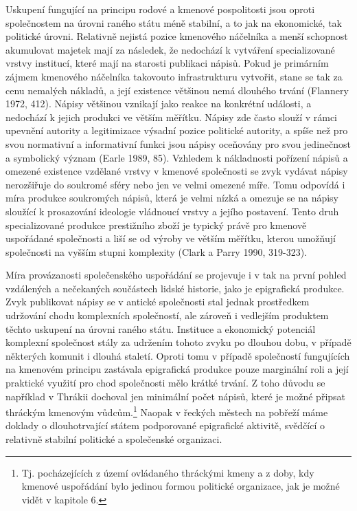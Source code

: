 Uskupení fungující na principu rodové a kmenové pospolitosti jsou oproti společnostem na úrovni raného státu méně stabilní, a to jak na ekonomické, tak politické úrovni. Relativně nejistá pozice kmenového náčelníka a menší schopnost akumulovat majetek mají za následek, že nedochází k vytváření specializované vrstvy institucí, které mají na starosti publikaci nápisů. Pokud je primárním zájmem kmenového náčelníka takovouto infrastrukturu vytvořit, stane se tak za cenu nemalých nákladů, a její existence většinou nemá dlouhého trvání (Flannery 1972, 412). Nápisy většinou vznikají jako reakce na konkrétní události, a nedochází k jejich produkci ve větším měřítku. Nápisy zde často slouží v rámci upevnění autority a legitimizace výsadní pozice politické autority, a spíše než pro svou normativní a informativní funkci jsou nápisy oceňovány pro svou jedinečnost a symbolický význam (Earle 1989, 85). Vzhledem k nákladnosti pořízení nápisů a omezené existence vzdělané vrstvy v kmenové společnosti se zvyk vydávat nápisy nerozšiřuje do soukromé sféry nebo jen ve velmi omezené míře. Tomu odpovídá i míra produkce soukromých nápisů, která je velmi nízká a omezuje se na nápisy sloužící k prosazování ideologie vládnoucí vrstvy a jejího postavení. Tento druh specializované produkce prestižního zboží je typický právě pro kmenově uspořádané společnosti a liší se od výroby ve větším měřítku, kterou umožňují společnosti na vyšším stupni komplexity (Clark a Parry 1990, 319-323).

Míra provázanosti společenského uspořádání se projevuje i v tak na první pohled vzdálených a nečekaných součástech lidské historie, jako je epigrafická produkce. Zvyk publikovat nápisy se v antické společnosti stal jednak prostředkem udržování chodu komplexních společností, ale zároveň i vedlejším produktem těchto uskupení na úrovni raného státu. Instituce a ekonomický potenciál komplexní společnost stály za udržením tohoto zvyku po dlouhou dobu, v případě některých komunit i dlouhá staletí. Oproti tomu v případě společností fungujících na kmenovém principu zastávala epigrafická produkce pouze marginální roli a její praktické využití pro chod společnosti mělo krátké trvání. Z toho důvodu se například v Thrákii dochoval jen minimální počet nápisů, které je možné připsat thráckým kmenovým vůdcům.\footnote{Tj. pocházejících z území ovládaného thráckými kmeny a z doby, kdy kmenové uspořádání bylo jedinou formou politické organizace, jak je možné vidět v kapitole 6.} Naopak v řeckých městech na pobřeží máme doklady o dlouhotrvající státem podporované epigrafické aktivitě, svědčící o relativně stabilní politické a společenské organizaci.

